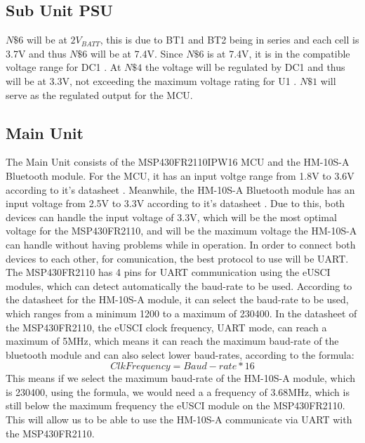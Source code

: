 \subsection{Sub Unit PSU}
$N\$6$ will be at $2V_{BATT}$, this is due to BT1 and BT2 being in series and each cell is 3.7\si{\V} \cite{ICR186502200F} and thus $N\$6$ will be at 7.4\si{\V}. Since $N\$6$ is at 7.4\si{\V}, it is in the compatible voltage range for DC1 \cite{BA033CC0FPE2}. At $N\$4$ the voltage will be regulated by DC1 and thus will be at 3.3\si{\V}, not exceeding the maximum voltage rating for U1 \cite{BA033CC0FPE2}. $N\$1$ will serve as the regulated output for the MCU.
\subsection{Main Unit}
The Main Unit consists of the MSP430FR2110IPW16 MCU and the HM-10S-A Bluetooth module. For the MCU, it has an input voltge range from 1.8\si{\V} to 3.6\si{\V} according to it's datasheet \cite{Citation}. Meanwhile, the HM-10S-A Bluetooth module has an input voltage from 2.5\si{\V} to 3.3\si{\V} according to it's datasheet \cite{Citation}. Due to this, both devices can handle the input voltage of 3.3\si{\V}, which will be the most optimal voltage for the MSP430FR2110, and will be the maximum voltage the HM-10S-A can handle without having problems while in operation. In order to connect both devices to each other, for comunication, the best protocol to use will be UART. The MSP430FR2110 has 4 pins for UART communication using the eUSCI modules, which can detect automatically the baud-rate to be used. According to the datasheet for the HM-10S-A module\cite{Citation}, it can select the baud-rate to be used, which ranges from a minimum 1200 to a maximum of 230400. In the datasheet of the MSP430FR2110, the eUSCI clock frequency, UART mode, can reach a maximum of 5MHz, which means it can reach the maximum baud-rate of the bluetooth module and can also select lower baud-rates, according to the formula:
\begin{equation}
	Clk Frequency= Baud-rate * 16
	\label{eq:UART Frequency}
\end{equation}
This means if we select the maximum baud-rate of the HM-10S-A module, which is 230400, using the formula, we would need a a frequency of 3.68MHz, which is still below the maximum frequency the eUSCI module on the MSP430FR2110. This will allow us to be able to use the HM-10S-A communicate via UART with the MSP430FR2110. 
